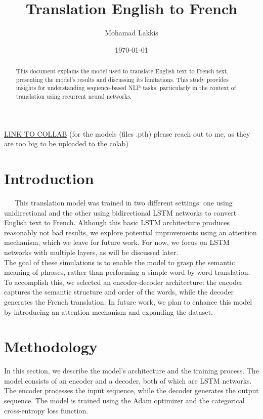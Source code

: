 \documentclass{article}
\title{Translation English to French}
\author{Mohamad Lakkis}
\date{\today}
\begin{document}
\maketitle

\href{https://colab.research.google.com/drive/1v0oAvkeRjcL7hnDsjFzp0cvoUHiDxWXb#scrollTo=-SFZRSpWS6KQ}{LINK TO COLLAB}
(for the models (files .pth) please reach out to me, as they are too big to be uploaded to the colab)\\
\begin{abstract}
  This document explains the model used to translate English text to French text, presenting the model's results and discussing its limitations. This study provides insights for understanding sequence-based NLP tasks, particularly in the context of translation using recurrent neural networks.
\end{abstract}
  
\section{Introduction}
\ \ \ This translation model was trained in two different settings: one using unidirectional and the other using bidirectional LSTM networks to convert English text to French. Although this basic LSTM architecture produces reasonably not bad results, we explore potential improvements using an attention mechanism, which we leave for future work. For now, we focus on LSTM networks with multiple layers, as will be discussed later.\\

The goal of these simulations is to enable the model to grasp the semantic meaning of phrases, rather than performing a simple word-by-word translation. To accomplish this, we selected an encoder-decoder architecture: the encoder captures the semantic structure and order of the words, while the decoder generates the French translation. In future work, we plan to enhance this model by introducing an attention mechanism and expanding the dataset.\\

\section{Methodology}
In this section, we describe the model's architecture and the training process. The model consists of an encoder and a decoder, both of which are LSTM networks. The encoder processes the input sequence, while the decoder generates the output sequence. The model is trained using the Adam optimizer and the categorical cross-entropy loss function.\\
\end{document}
